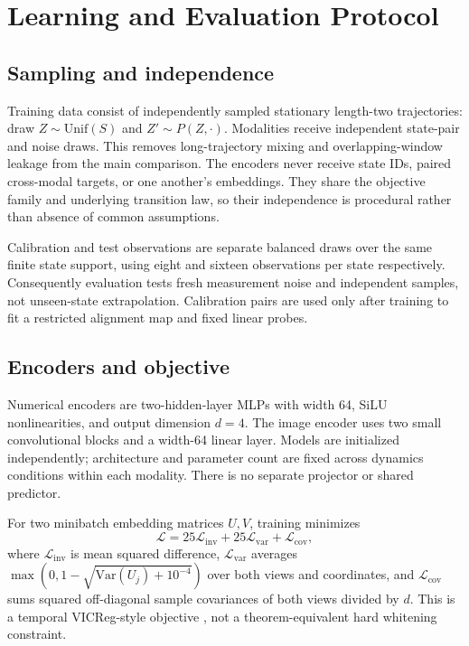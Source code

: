 \documentclass[11pt,a4paper]{article}
\begin{document}
\section{Learning and Evaluation Protocol}
\subsection{Sampling and independence}
Training data consist of independently sampled stationary length-two trajectories: draw $Z\sim\mathrm{Unif}(S)$ and $Z'\sim P(Z,\cdot)$. Modalities receive independent state-pair and noise draws. This removes long-trajectory mixing and overlapping-window leakage from the main comparison. The encoders never receive state IDs, paired cross-modal targets, or one another's embeddings. They share the objective family and underlying transition law, so their independence is procedural rather than absence of common assumptions.

Calibration and test observations are separate balanced draws over the same finite state support, using eight and sixteen observations per state respectively. Consequently evaluation tests fresh measurement noise and independent samples, not unseen-state extrapolation. Calibration pairs are used only after training to fit a restricted alignment map and fixed linear probes.

\subsection{Encoders and objective}
Numerical encoders are two-hidden-layer MLPs with width 64, SiLU nonlinearities, and output dimension $d=4$. The image encoder uses two small convolutional blocks and a width-64 linear layer. Models are initialized independently; architecture and parameter count are fixed across dynamics conditions within each modality. There is no separate projector or shared predictor.

For two minibatch embedding matrices $U,V$, training minimizes
\begin{equation}
\mathcal L=25\mathcal L_{\mathrm{inv}}+25\mathcal L_{\mathrm{var}}+\mathcal L_{\mathrm{cov}},
\end{equation}
where $\mathcal L_{\mathrm{inv}}$ is mean squared difference, $\mathcal L_{\mathrm{var}}$ averages $\max(0,1-\sqrt{\mathrm{Var}(U_j)+10^{-4}})$ over both views and coordinates, and $\mathcal L_{\mathrm{cov}}$ sums squared off-diagonal sample covariances of both views divided by $d$. This is a temporal VICReg-style objective \citep{bardes2022}, not a theorem-equivalent hard whitening constraint.
\end{document}
